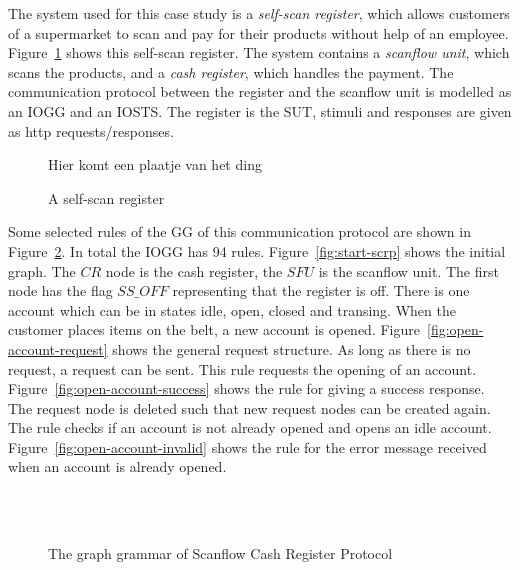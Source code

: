 The system used for this case study is a \textit{self-scan register}, which allows customers of a supermarket to scan and pay for their products without help of an employee. Figure~\ref{fig:register} shows this self-scan register. The system contains a \textit{scanflow unit}, which scans the products, and a \textit{cash register}, which handles the payment. The communication protocol between the register and the scanflow unit is modelled as an IOGG and an IOSTS. The register is the SUT, stimuli and responses are given as http requests/responses.

\begin{figure}[ht]
  \begin{center}
    Hier komt een plaatje van het ding%
  \end{center}
  \caption{A self-scan register}
  \label{fig:register}
\end{figure}

Some selected rules of the GG of this communication protocol are shown in Figure~\ref{fig:gg-fwgc}. In total the IOGG has 94 rules. Figure~\ref{fig:start-scrp} shows the initial graph. The $CR$ node is the cash register, the $SFU$ is the scanflow unit. The first node has the flag $\mathit{SS\_OFF}$ representing that the register is off. There is one account which can be in states idle, open, closed and transing. When the customer places items on the belt, a new account is opened. Figure~\ref{fig:open-account-request} shows the general request structure. As long as there is no request, a request can be sent. This rule requests the opening of an account. Figure~\ref{fig:open-account-success} shows the rule for giving a success response. The request node is deleted such that new request nodes can be created again. The rule checks if an account is not already opened and opens an idle account. Figure~\ref{fig:open-account-invalid} shows the rule for the error message received when an account is already opened. 

\begin{figure}[ht]
  \begin{center}
    \hspace{20px}
    \\
    \hspace{20px}
    \\
    \hspace{20px}
  \end{center}
  \caption{The graph grammar of Scanflow Cash Register Protocol}
  \label{fig:gg-fwgc}
\end{figure}

